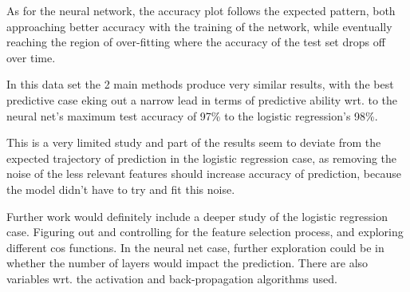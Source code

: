 \documentclass[10pt]{article}
\begin{document}
As for the neural network, the accuracy plot follows the expected pattern, both
approaching better accuracy with the training of the network, while eventually
reaching the region of over-fitting where the accuracy of the test set drops
off over time. 

In this data set the 2 main methods produce very similar results, with the best
predictive case eking out a narrow lead in terms of predictive ability wrt. to
the neural net's maximum test accuracy of 97\% to the logistic regression's
98\%.

This is a very limited study and part of the results seem to deviate from the 
expected trajectory of prediction in the logistic regression case, as removing the
noise of the less relevant features should increase accuracy of prediction, because
the model didn't have to try and fit this noise.

Further work would definitely include a deeper study of the logistic regression case. 
Figuring out and controlling for the feature selection process, and exploring different
cos functions. In the neural net case, further exploration could be in whether the number
of layers would impact the prediction. There are also variables wrt. the activation and 
back-propagation algorithms used. 





\end{document}
